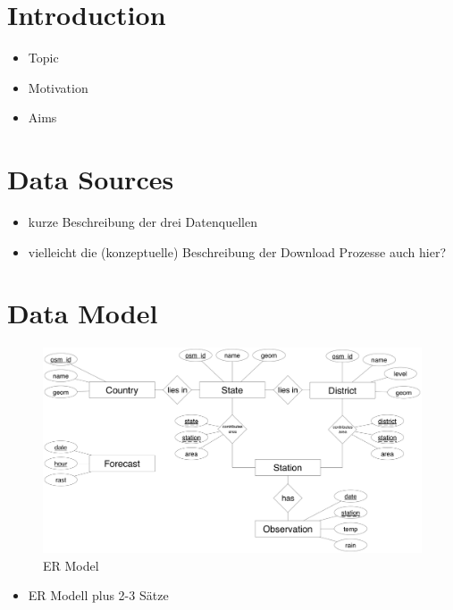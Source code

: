 \section{Introduction}\label{introduction}

\begin{itemize}
\itemsep1pt\parskip0pt
\item
  Topic
\item
  Motivation
\item
  Aims
\end{itemize}

\section{Data Sources}\label{data-sources}

\begin{itemize}
\itemsep1pt\parskip0pt
\item
  kurze Beschreibung der drei Datenquellen
\item
  vielleicht die (konzeptuelle) Beschreibung der Download Prozesse auch
  hier?
\end{itemize}

\section{Data Model}\label{data-model}

\begin{figure}[htbp]
\centering
\includegraphics{pictures/er-model.jpg}
\caption{ER Model}
\end{figure}

\begin{itemize}
\itemsep1pt\parskip0pt
\item
  ER Modell plus 2-3 Sätze
\end{itemize}

